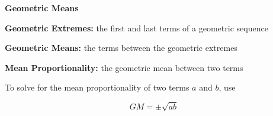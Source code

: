 \begin{center}
\textbf{Geometric Means}
\end{center}

\vspace*{1ex}


\textbf{Geometric Extremes:} the first and last terms of a geometric sequence 
\vspce

\textbf{Geometric Means:} the terms between the geometric extremes 
\vspce

\textbf{Mean Proportionality:} the geometric mean between two terms 
\vspce

To solve for the mean proportionality of two terms $a$ and $b$, use

$$\displaystyle GM = \pm\sqrt{ab}$$%
